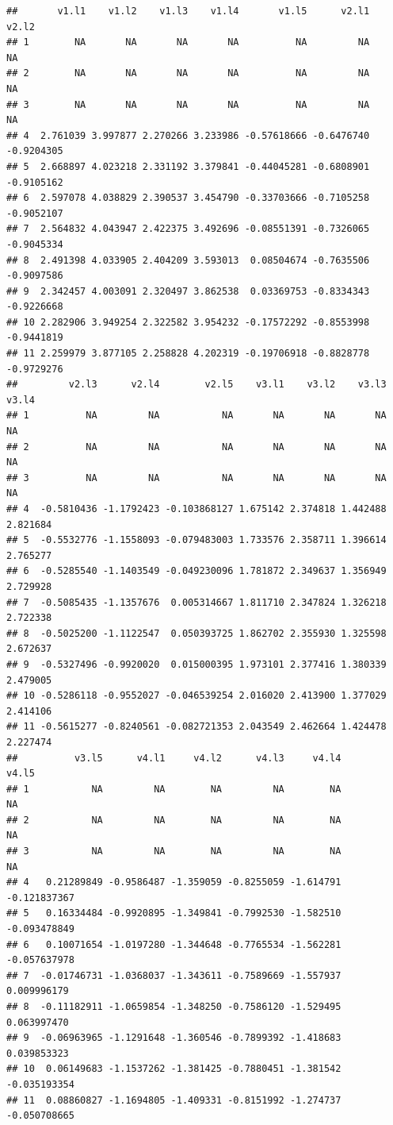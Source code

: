 \documentclass[
]{book}
\begin{document}
\begin{verbatim}
##       v1.l1    v1.l2    v1.l3    v1.l4       v1.l5      v2.l1      v2.l2
## 1        NA       NA       NA       NA          NA         NA         NA
## 2        NA       NA       NA       NA          NA         NA         NA
## 3        NA       NA       NA       NA          NA         NA         NA
## 4  2.761039 3.997877 2.270266 3.233986 -0.57618666 -0.6476740 -0.9204305
## 5  2.668897 4.023218 2.331192 3.379841 -0.44045281 -0.6808901 -0.9105162
## 6  2.597078 4.038829 2.390537 3.454790 -0.33703666 -0.7105258 -0.9052107
## 7  2.564832 4.043947 2.422375 3.492696 -0.08551391 -0.7326065 -0.9045334
## 8  2.491398 4.033905 2.404209 3.593013  0.08504674 -0.7635506 -0.9097586
## 9  2.342457 4.003091 2.320497 3.862538  0.03369753 -0.8334343 -0.9226668
## 10 2.282906 3.949254 2.322582 3.954232 -0.17572292 -0.8553998 -0.9441819
## 11 2.259979 3.877105 2.258828 4.202319 -0.19706918 -0.8828778 -0.9729276
##         v2.l3      v2.l4        v2.l5    v3.l1    v3.l2    v3.l3    v3.l4
## 1          NA         NA           NA       NA       NA       NA       NA
## 2          NA         NA           NA       NA       NA       NA       NA
## 3          NA         NA           NA       NA       NA       NA       NA
## 4  -0.5810436 -1.1792423 -0.103868127 1.675142 2.374818 1.442488 2.821684
## 5  -0.5532776 -1.1558093 -0.079483003 1.733576 2.358711 1.396614 2.765277
## 6  -0.5285540 -1.1403549 -0.049230096 1.781872 2.349637 1.356949 2.729928
## 7  -0.5085435 -1.1357676  0.005314667 1.811710 2.347824 1.326218 2.722338
## 8  -0.5025200 -1.1122547  0.050393725 1.862702 2.355930 1.325598 2.672637
## 9  -0.5327496 -0.9920020  0.015000395 1.973101 2.377416 1.380339 2.479005
## 10 -0.5286118 -0.9552027 -0.046539254 2.016020 2.413900 1.377029 2.414106
## 11 -0.5615277 -0.8240561 -0.082721353 2.043549 2.462664 1.424478 2.227474
##          v3.l5      v4.l1     v4.l2      v4.l3     v4.l4        v4.l5
## 1           NA         NA        NA         NA        NA           NA
## 2           NA         NA        NA         NA        NA           NA
## 3           NA         NA        NA         NA        NA           NA
## 4   0.21289849 -0.9586487 -1.359059 -0.8255059 -1.614791 -0.121837367
## 5   0.16334484 -0.9920895 -1.349841 -0.7992530 -1.582510 -0.093478849
## 6   0.10071654 -1.0197280 -1.344648 -0.7765534 -1.562281 -0.057637978
## 7  -0.01746731 -1.0368037 -1.343611 -0.7589669 -1.557937  0.009996179
## 8  -0.11182911 -1.0659854 -1.348250 -0.7586120 -1.529495  0.063997470
## 9  -0.06963965 -1.1291648 -1.360546 -0.7899392 -1.418683  0.039853323
## 10  0.06149683 -1.1537262 -1.381425 -0.7880451 -1.381542 -0.035193354
## 11  0.08860827 -1.1694805 -1.409331 -0.8151992 -1.274737 -0.050708665
\end{verbatim}
\end{document}
